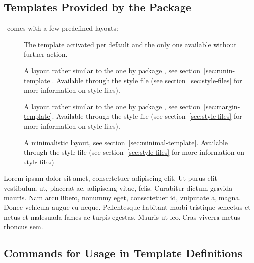 \documentclass{xsim-manual}
\begin{document}
\subsection{Templates Provided by the Package}
\xsim\ comes with a few predefined layouts:
\begin{description}
  \item[] The template activated per default and the only one
    available without further action.
  \item[] A layout rather similar to the one by package
    , see section~\vref{sec:runin-template}.  Available through
    the style file  (see section~\vref{sec:style-files} for more
    information on style files).
  \item[] A layout rather similar to the one by package
    , see section~\ref{sec:margin-template}.  Available through
    the style file  (see section~\vref{sec:style-files} for more
    information on style files).
  \item[] A minimalistic layout, see
    section~\ref{sec:minimal-template}.  Available through the style file
     (see section~\vref{sec:style-files} for more information on
    style files).
\end{description}

\begin{exercise}[subtitle=The Subtitle,points=2.5,ID=showlayout]
  Lorem ipsum dolor sit amet, consectetuer adipiscing elit. Ut purus elit,
  vestibulum ut, placerat ac, adipiscing vitae, felis. Curabitur dictum
  gravida mauris. Nam arcu libero, nonummy eget, consectetuer id, vulputate a,
  magna. Donec vehicula augue eu neque. Pellentesque habitant morbi tristique
  senectus et netus et malesuada fames ac turpis egestas. Mauris ut leo. Cras
  viverra metus rhoncus sem.
\end{exercise}

\listlayouts

\subsection{Commands for Usage in Template Definitions}
\end{document}
